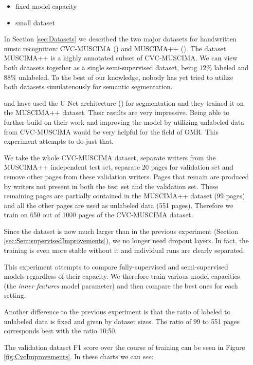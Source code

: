 \begin{itemize}
    \item fixed model capacity
    \item small dataset
\end{itemize}

In Section \ref{sec:Datasets} we described the two major datasets for handwritten music recognition: CVC-MUSCIMA (\cite{CvcMuscima}) and MUSCIMA++ (\cite{MuscimaPP}). The dataset MUSCIMA++ is a highly annotated subset of CVC-MUSCIMA. We can view both datasets together as a single semi-supervised dataset, being 12\% labeled and 88\% unlabeled. To the best of our knowledge, nobody has yet tried to utilize both datasets simulatenously for semantic segmentation.

\cite{DorferEtAl} and \cite{HajicEtAl} have used the U-Net architecture (\cite{UNet}) for segmentation and they trained it on the MUSCIMA++ dataset. Their results are very impressive. Being able to further build on their work and improving the model by utilizing unlabeled data from CVC-MUSCIMA would be very helpful for the field of OMR. This experiment attempts to do just that.

We take the whole CVC-MUSCIMA dataset, separate writers from the MUSCIMA++ independent test set, separate 20 pages for validation set and remove other pages from these validation writers. Pages that remain are produced by writers not present in both the test set and the validation set. These remaining pages are partially contained in the MUSCIMA++ dataset (99 pages) and all the other pages are used as unlabeled data (551 pages). Therefore we train on 650 out of 1000 pages of the CVC-MUSCIMA dataset.

Since the dataset is now much larger than in the previous experiment (Section \ref{sec:SemisupervisedImprovements}), we no longer need dropout layers. In fact, the training is even more stable without it and individual runs are clearly separated.

This experiment attempts to compare fully-supervised and semi-supervised models regardless of their capacity. We therefore train various model capacities (the \emph{inner features} model parameter) and then compare the best ones for each setting.

Another difference to the previous experiment is that the ratio of labeled to unlabeled data is fixed and given by dataset sizes. The ratio of 99 to 551 pages corresponds best with the ratio 10:50.

The validation dataset F1 score over the course of training can be seen in Figure \ref{fig:CvcImprovements}. In these charts we can see:

